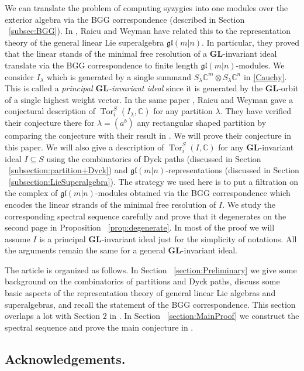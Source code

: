 \documentclass[12pt]{amsart}
\theoremstyle{definition}
\theoremstyle{remark}
\newcommand{\bbC}{\mathbb{C}}
\newcommand{\GL}{\mathbf{GL}}
\newcommand{\gl}{\mathfrak{gl}}
\newcommand{\Tor}{\operatorname{Tor}}
\numberwithin{equation}{section}
\begin{document}
We can translate the problem of computing syzygies into one modules over the exterior algebra via the BGG correspondence (described in Section ~\ref{subsec:BGG}). In \cite{RW}, Raicu and Weyman have related this to the representation theory of the general linear Lie superalgebra $\gl(m|n)$. In particular, they proved that the linear stands of the minimal free resolution of a $\GL$-invariant ideal translate via the BGG correspondence to finite length $\gl(m|n)$-modules. We consider $I_{\lambda}$ which is generated by a single summand $S_{\lambda} \bbC^m \otimes S_{\lambda} \bbC^n$ in \ref{Cauchy}. This is called a \emph{principal $\GL$-invariant ideal} since it is generated by the $\GL$-orbit of a single highest weight vector. In the same paper \cite{RW}, Raicu and Weyman gave a conjectural description of $\Tor_i^S(I_{\lambda},\bbC)$ for any partition $\lambda$. They have verified their conjecture there for $\lambda = (a^b)$ any rectangular shaped partition by comparing the conjecture with their result in \cite{RW17}. We will prove their conjecture in this paper. We will also give a description of $\Tor_i^S(I,\bbC)$ for any $\GL$-invariant ideal $I \subseteq S$ using the combinatorics of Dyck paths (discussed in Section ~\ref{subsection:partition+Dyck}) and $\gl(m|n)$-representations (discussed in Section ~\ref{subsection:LieSuperalgebra}). The strategy we used here is to put a filtration on the complex of $\gl(m|n)$-modules obtained via the BGG correspondence which encodes the linear strands of the minimal free resolution of $I$. We study the corresponding spectral sequence carefully and prove that it degenerates on the second page in Proposition ~\ref{prop:degenerate}. In most of the proof we will assume $I$ is a principal $\GL$-invariant ideal just for the simplicity of notations. All the arguments remain the same for a general $\GL$-invariant ideal. 

The article is organized as follows. In Section ~\ref{section:Preliminary} we give some background on the combinatorics of partitions and Dyck paths, discuss some basic aspects of the representation theory of general linear Lie algebras and superalgebras, and recall the statement of the BGG correspondence. This section overlaps a lot with Section $2$ in \cite{RW}. In Section ~\ref{section:MainProof} we construct the spectral sequence and prove the main conjecture in \cite{RW}.

\subsection*{Acknowledgements.} 
\end{document}
